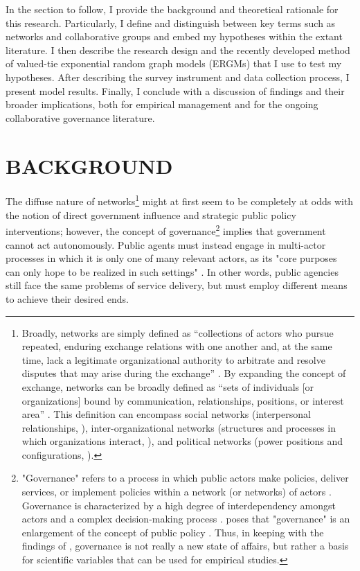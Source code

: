 \documentclass[12pt,a4paper,titlepage]{article}
\begin{document}
In the section to follow, I provide the background and theoretical rationale for this research. Particularly, I define and distinguish between key terms such as networks and collaborative groups and embed my hypotheses within the extant literature. I then describe the research design and the recently developed method of valued-tie exponential random graph models (ERGMs) \parencite{krivitsky2012, krivitsky2013,cranmer2011,desmarais2012-a,wyatt2009,wyatt2010} that I use to test my hypotheses. After describing the survey instrument and data collection process, I present model results. Finally, I conclude with a discussion of findings and their broader implications, both for empirical management and for the ongoing collaborative governance literature.

\section{\bf\MakeUppercase{Background}}

The diffuse nature of networks\footnote{Broadly, networks are simply defined as “collections of actors who pursue repeated, enduring exchange relations with one another and, at the same time, lack a legitimate organizational authority to arbitrate and resolve disputes that may arise during the exchange” \parencite[59]{podolny1998}. By expanding the concept of exchange, networks can be broadly defined as “sets of individuals [or organizations] bound by communication, relationships, positions, or interest area” \parencite[33]{margerum2011}. This definition can encompass social networks (interpersonal relationships, \parencite{putnam2000}), inter-organizational networks (structures and processes in which organizations interact, \parencite{alexander1993}), and political networks (power positions and configurations, \parencite{knoke1990}).} might at first seem to be completely at odds with the notion of direct government influence and strategic public policy interventions; however, the concept of governance\footnote{"Governance" refers to a process in which public actors make policies, deliver services, or implement policies within a network (or networks) of actors \parencite{frederickson2005,rhodes1997,torfing2007}. Governance is characterized by a high degree of interdependency amongst actors and a complex decision-making process \parencite{klijn2010}. \textcite[125]{bressers2009} poses that "governance" is an enlargement of the concept of public policy \parencite[also][]{bressers2003}. Thus, in keeping with the findings of \textcite{ostrom1961}, governance is not really a new state of affairs, but rather a basis for scientific variables that can be used for empirical studies.} implies that government cannot act autonomously. Public agents must instead engage in multi-actor processes in which it is only one of many relevant actors, as its "core purposes can only hope to be realized in such settings" \parencite[130]{bressers2009}. In other words, public agencies still face the same problems of service delivery, but must employ different means to achieve their desired ends.
\end{document}
